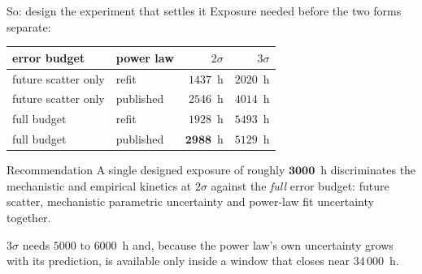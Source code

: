 \documentclass[aspectratio=169,10pt]{beamer}
\begin{document}
\begin{frame}{So: design the experiment that settles it}
Exposure needed before the two forms separate:

\vspace{0.7em}
\centering
\begin{tabular}{llrr}
\toprule
error budget & power law & $2\sigma$ & $3\sigma$ \\
\midrule
future scatter only & refit      & $1437$~h & $2020$~h \\
future scatter only & published  & $2546$~h & $4014$~h \\
\midrule
full budget         & refit      & $1928$~h & $5493$~h \\
full budget         & published  & $\mathbf{2988}$~h & $5129$~h \\
\bottomrule
\end{tabular}

\vspace{1.0em}
\raggedright
\begin{block}{Recommendation}
A single designed exposure of roughly $\mathbf{3000}$~h discriminates the
mechanistic and empirical kinetics at $2\sigma$ against the \emph{full}
error budget: future scatter, mechanistic parametric uncertainty and
power-law fit uncertainty together.
\end{block}

\vspace{0.3em}
\scriptsize
$3\sigma$ needs $5000$ to $6000$~h and, because the power law's own
uncertainty grows with its prediction, is available only inside a window
that closes near $34\,000$~h.
\end{frame}
\end{document}
